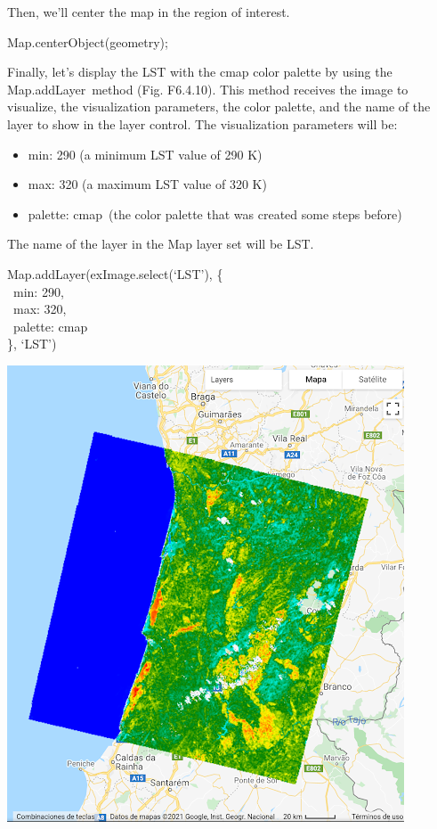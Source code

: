 \documentclass[
  letterpaper,
  DIV=11,
  numbers=noendperiod]{scrreprt}
\providecommand{\tightlist}{%
  \setlength{\itemsep}{0pt}\setlength{\parskip}{0pt}}\usepackage{longtable,booktabs,array}
\begin{document}
Then, we'll center the map in the region of interest.

Map.centerObject(geometry);

Finally, let's display the LST with the cmap color palette by using the
Map.addLayer~method (Fig. F6.4.10). This method receives the image to
visualize, the visualization parameters, the color palette, and the name
of the layer to show in the layer control. The visualization parameters
will be:

\begin{itemize}
\tightlist
\item
  min: 290 (a minimum LST value of 290 K)
\item
  max: 320 (a maximum LST value of 320 K)
\item
  palette: cmap~(the color palette that was created some steps before)
\end{itemize}

The name of the layer in the Map layer set will be LST.

Map.addLayer(exImage.select(`LST'), \{\\
\hspace*{0.333em} ~min: 290,\\
\hspace*{0.333em} ~max: 320,\\
\hspace*{0.333em} ~palette: cmap\\
\}, `LST')

\includegraphics{./F6/image45.png}
\end{document}

